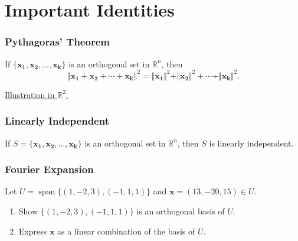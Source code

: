 \documentclass[20pt,a4paper]{extarticle}
\DeclareMathOperator{\Span}{span}
\newcounter{example}
\newcounter{theorem}
\begin{document}
	\begin{solution}

	\end{solution}

	\newpage 

\section{Important Identities}

	\subsubsection{Pythagoras' Theorem}

	\begin{theorem}
	If $\{ \mathbf{x_1} , \mathbf{x_2} , \ldots , \mathbf{x_k} \}$ is an orthogonal set in $\mathbb{R}^n$, then
		\[
			\Vert \mathbf{x_1} + \mathbf{x_2} + \cdots + \mathbf{x_k} \Vert^2 = \Vert \mathbf{x_1} \Vert^2 + \Vert \mathbf{x_2} \Vert^2 + \cdots + \Vert \mathbf{x_k} \Vert^2 .
		\]
	\end{theorem}

	\underline{Illustration in $\mathbb{R}^2$.}

	\vspace*{5cm} 

	\subsubsection{Linearly Independent}

	\begin{theorem}
	If $S = \{ \mathbf{x_1}, \mathbf{x_2} , \ldots , \mathbf{x_k} \}$ is an orthogonal set in $\mathbb{R}^n$, then $S$ is linearly independent.
	\end{theorem}

	\newpage 

	\subsubsection{Fourier Expansion}

	\begin{example}
	Let $U = \Span \{ (1, -2, 3), (-1, 1, 1) \}$ and $\mathbf{x} = (13, -20, 15) \in U$. 
		\begin{enumerate}[label=\alph*)]
			\item Show $\{ (1, -2, 3) , (-1, 1, 1) \}$ is an orthogonal basis of $U$.
			\item Express $\mathbf{x}$ as a linear combination of the basis of $U$.
		\end{enumerate}
	\end{example}
\end{document}
